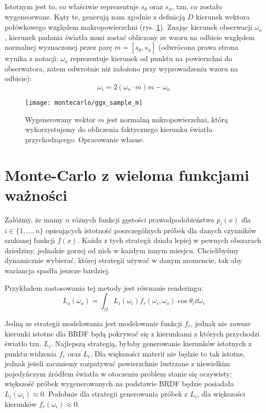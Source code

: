 \documentclass[../main.tex]{subfiles}
\begin{document}
Istotnym jest to, co właściwie reprezentuje $s_\theta$ oraz $s_\phi$, tzn. co zostało wygeneorwane. Kąty te, generują nam zgodnie z definicją $D$ kierunek wektora połówkowego względem makropowierzchni (rys. \ref{fig:GGXSampleMReflect}). Znając kierunek obserwacji $\omega_o$, kierunek padania światła musi zostać obliczony ze wzoru na odbicie względem normalnej wyznaczonej przez parę $m = [s_\theta, s_\phi]$ (odwrócona prawa strona wynika z notacji: $\omega_o$ reprezentuje kierunek od punktu na powierzchni do obserwatora, zatem odwrotnie niż założono przy wyprowadzeniu wzoru na odbicie):
\[
	\omega_i = 2(\omega_o \cdot m)m - \omega_o
\]

\begin{figure}[h]
    \centering
    \texttt{[image: montecarlo/ggx\_sample\_m]}
    \caption{Wygenerowany wektor $m$ jest normalną mikropowierzchni, którą wykorzystujemy do obliczenia faktycznego kierunku światła przychodzącego. Opracowanie własne.}
    \label{fig:GGXSampleMReflect}
\end{figure}

\section{Monte-Carlo z wieloma funkcjami ważności}
\label{Chapter:MIS}

Załóżmy, że mamy $n$ różnych funkcji gęstości prawodpodobieństwa $p_{i}(x)$ dla $i \in \{ 1, \ldots, n \}$ opisujących istotność poszczególnych próbek dla danych czynników szukanej funkcji $f(x)$. Każda z tych strategii działa lepiej w pewnych obszarach dziedziny, jednakże gorzej od nich w każdym innym miesjcu. Chcielibyśmy dynamicznie wybierać, której strategii używać w danym momencie, tak aby wariancja spadła jeszcze bardziej.

Przykładem zastosowania tej metody jest równanie renderingu:
\[
L_o(\omega_o) = \int_{\Omega} {
	L_i(\omega_{i})
	f_r(\omega_{i}, \omega_{o})
	\cos \theta_{i}
	\dd\omega_{i}
}
\]

Jedną ze strategii modelowania jest modelowanie funkcji $f_r$, jednak nie zawsze kierunki istotne dla BRDF będą pokrywać się z kierunkami z których przychodzi światło tzn. $L_i$. Najlepszą strategią, byłoby generowanie kierunków istotnych z punktu widzenia $f_r$ oraz $L_i$. Dla większości materii nie będzie to tak istotne, jednak jeżeli zaczniemy rozpatywać powierzchnie lustrzane z niewielkim pojedyńczym źródłem światła w otoczeniu problem stanie się oczywisty: większość próbek wygenerowanych na podstawie BRDF będzie posiadała $L_i(\omega_i) \approx 0$. Podobnie dla strategii generowania próbek z $L_i$, dla większości kierunków $f_r(\omega_i) \approx 0$.
\end{document}
